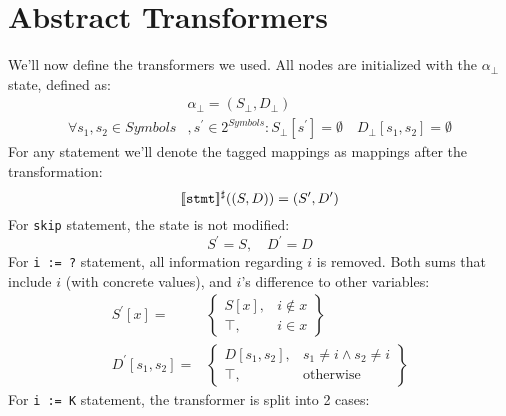 \section*{Abstract Transformers}

We'll now define the transformers we used. All nodes are initialized with the $\alpha_\bot$ state, defined as:
\begin{align*}
	&\alpha_\bot=(S_\bot, D_\bot) \\
	\forall s_1,s_2 \in Symbols&, s^\prime \in 2^{Symbols}:
	S_\bot[s^\prime] =\emptyset \quad
	D_\bot[s_1,s_2] =\emptyset
\end{align*}
For any statement we'll denote the tagged mappings as mappings after the transformation:
\begin{equation*}
	[\![\texttt{stmt}]\!]^\sharp((S,D)) = (S^\prime,D^\prime)
\end{equation*}
For \texttt{skip} statement, the state is not modified:
\begin{equation*}
	S^\prime = S, \quad D^\prime = D
\end{equation*}
For \texttt{i := ?} statement, all information regarding $i$ is removed. Both sums that include $i$ (with concrete values), and $i$'s difference to other variables:
\begin{align*}
S^\prime[x] = & \left.
	\begin{cases}
		S[x], & i \notin x \\
		\top, & i \in x
	\end{cases}
\right\}\\
D^\prime[s_1, s_2] = & \left.
	\begin{cases}
		D[s_1,s_2], & s_1 \ne i \wedge s_2 \ne i \\
		\top, & \text{otherwise}
	\end{cases}
\right\}
\end{align*}
For \texttt{i := K} statement, the transformer is split into 2 cases:
